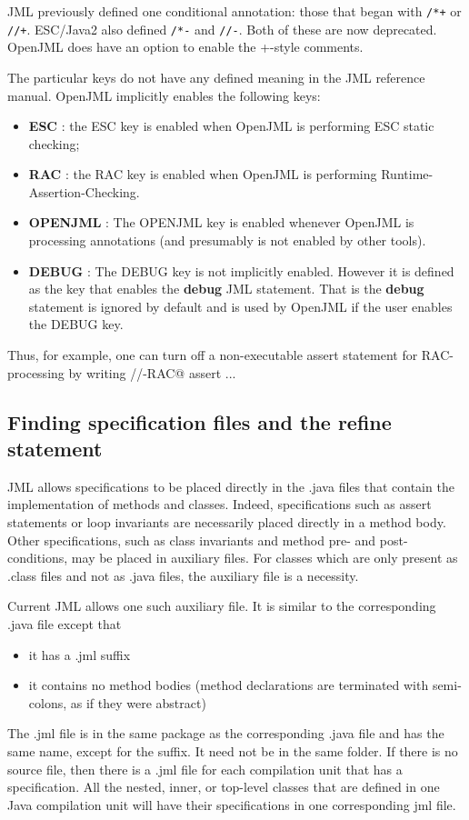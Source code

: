 JML previously defined one conditional annotation: those that began with {\tt /*+\at} or {\tt //+\at}. ESC/Java2 also defined
{\tt /*-\at} and {\tt //-\at}. Both of these are now deprecated. OpenJML does have an option to enable the +-style comments.

The particular keys do not have any defined meaning in the JML reference manual. OpenJML implicitly enables the following keys:
\begin{itemize} 
\item {\bf ESC} : the ESC key is enabled when OpenJML is performing
ESC static checking; 
\item {\bf RAC} : the RAC key is enabled when OpenJML is performing Runtime-Assertion-Checking.
\item {\bf OPENJML} : The OPENJML key is enabled whenever OpenJML is processing annotations (and presumably is not enabled by other tools).
\item {\bf DEBUG} : The DEBUG key is not implicitly enabled. However it is defined as the key that enables the {\bf debug} JML statement. That is the {\bf debug} statement is ignored by default and is used by OpenJML if the user enables the DEBUG key.
\end{itemize}
Thus, for
example, one can turn off a non-executable assert statement for RAC-processing by writing //-RAC@ assert ... 


\subsection{Finding specification files and the refine statement}

JML allows specifications to be placed directly in the .java files that contain the implementation of methods and
classes. Indeed, specifications such as assert statements or loop invariants are necessarily placed directly in
a method body. Other specifications, such as class invariants and method pre- and post-conditions, may be placed in
auxiliary files. For classes which are only present as .class files and not as .java files, the auxiliary file is
a necessity.

Current JML allows one such auxiliary file. It is similar to the corresponding .java file except that
\begin{itemize} \nospace
\item it has a .jml suffix
\item it contains no method bodies (method declarations are terminated with semi-colons, as if they were abstract)
\end{itemize}
The .jml file is in the same package as the corresponding .java file and has the same name, except for the suffix. It need not be in the same folder.
If there is no source file, then there is a .jml file for each compilation unit that has a specification. All the nested, inner, or top-level classes that are defined in one Java compilation unit will have their specifications in one corresponding jml file.

